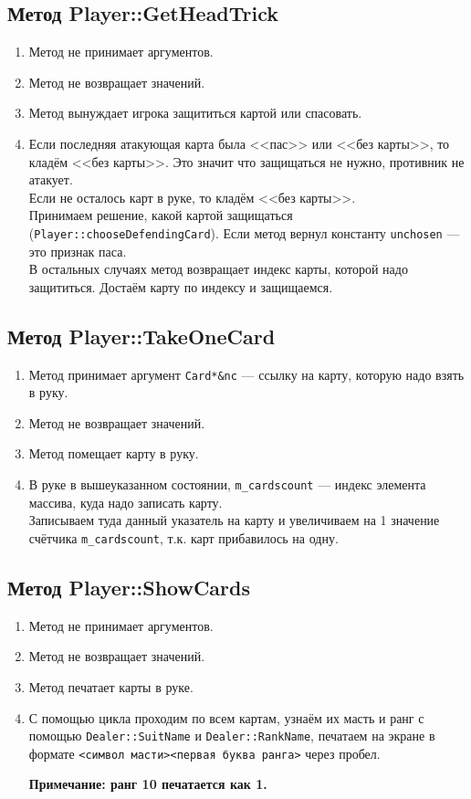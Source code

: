 \documentclass[a4paper,12pt]{article}
\begin{document}
		\subsection {Метод Player::GetHeadTrick} %
			\begin{enumerate}
				\item 	Метод не принимает аргументов.
				\item 	Метод не возвращает значений.
				\item 	Метод вынуждает игрока защититься картой или спасовать.
				\item 	Если последняя атакующая карта была <<пас>> или <<без карты>>, то кладём <<без карты>>.
						Это значит что защищаться не нужно, противник не атакует.\\
						Если не осталось карт в руке, то кладём <<без карты>>.\\
						Принимаем решение, какой картой защищаться (\texttt{Player::chooseDefendingCard}).
						Если метод вернул константу \texttt{unchosen} --- это признак паса.\\
						В остальных случаях метод возвращает индекс карты, которой надо защититься.
						Достаём карту по индексу и защищаемся.
			\end{enumerate}
		\subsection {Метод Player::TakeOneCard}
			\begin{enumerate}
				\item 	Метод принимает аргумент \texttt{Card*\&nc} --- ссылку на карту, которую надо взять в руку.
				\item 	Метод не возвращает значений.
				\item 	Метод помещает карту в руку.
				\item 	В руке в вышеуказанном состоянии, \texttt{m\_cardscount} --- индекс элемента массива, куда надо записать карту.\\
						Записываем туда данный указатель на карту и увеличиваем на 1 значение счётчика \texttt{m\_cardscount}, т.к. карт прибавилось на одну.
			\end{enumerate}
		\subsection {Метод Player::ShowCards}
			\begin{enumerate}
				\item 	Метод не принимает аргументов.
				\item 	Метод не возвращает значений.
				\item 	Метод печатает карты в руке.
				\item 	С помощью цикла проходим по всем картам,
						узнаём их масть и ранг с помощью \texttt{Dealer::SuitName} и \texttt{Dealer::RankName},
						печатаем на экране в формате \texttt{<символ масти><первая буква ранга>} через пробел.

						\textbf{Примечание: ранг 10 печатается как 1.}
			\end{enumerate}
\end{document}
